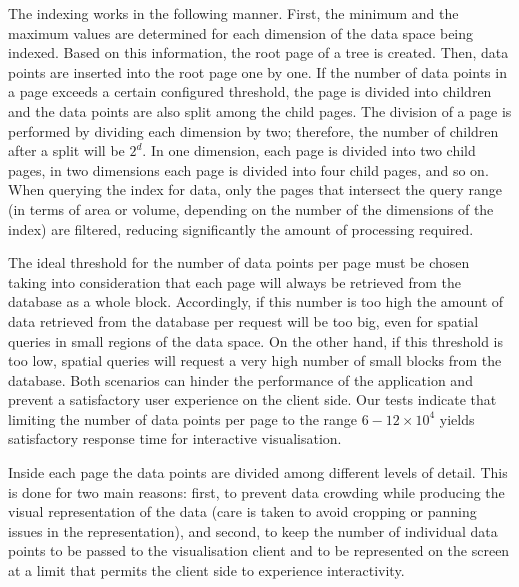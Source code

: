 \documentclass[longauth, final]{aa}
\begin{document}
 The indexing works in the following manner. First, the minimum and the maximum values are determined for each dimension of the data space being indexed. Based on this information, the root page of a tree is created. Then, data points are inserted into the root page one by one. If the number of data points in a page exceeds a certain configured threshold, the page is divided into children and the data points are also split among the child pages. The division of a page is performed by dividing each dimension by two; therefore, the number of children after a split will be $2^d$. In one dimension, each page is divided into two child pages, in two dimensions each page is divided into four child pages, and so on. When querying the index for data, only the pages that intersect the query range (in terms of area  or volume, depending on the number of the dimensions of the index) are filtered, reducing significantly the amount of processing required.

The ideal threshold for the number of data points per page must be chosen taking into consideration that each page will always be retrieved from the database as a whole block. Accordingly, if this number is too high the amount of data retrieved from the database per request will be too big, even for spatial queries in small regions of the data space. On the other hand, if this threshold is too low, spatial queries will request a very high number of small blocks from the database. Both scenarios can hinder the performance of the application and prevent a satisfactory user experience on the client side. Our tests indicate that limiting the number of data points per page to the range $6-12\times10^4$ yields satisfactory response time for interactive visualisation.

Inside each page the data points are divided among different levels of detail. This is done for two main reasons: first, to prevent data crowding while producing the visual representation of the data (care is taken to avoid cropping or panning issues in the representation), and second, to keep the number of individual data points to be passed to the visualisation client and to be represented on the screen at a limit that permits the client side to experience interactivity.

\end{document}

